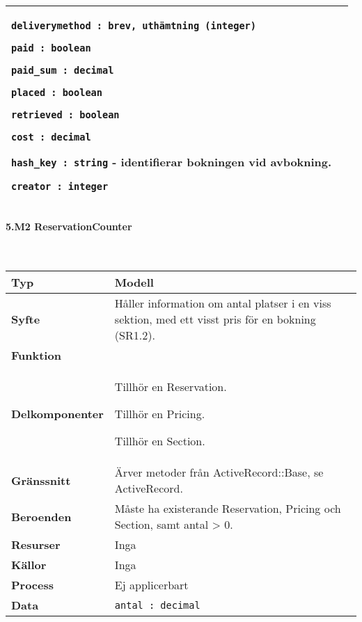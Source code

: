 \documentclass[a4paper, twoside, 11pt, titlepage]{article}
\begin{document}
\begin {table} [ht]
\begin{tabular} {  p{3.5cm} p{11.6cm} }
{{\tt deliverymethod : {brev, uthämtning} (integer)}

{\tt paid : boolean}

{\tt paid\_sum : decimal}

{\tt placed : boolean}

{\tt retrieved : boolean}

{\tt cost : decimal}

{\tt hash\_key : string} - identifierar bokningen vid avbokning.

{\tt creator : integer}} \\
				\hline
			\end{tabular} \end{table} \FloatBarrier


			\paragraph{5.M2 ReservationCounter}\

			\begin {table} [ht] \begin{tabular} {  p{3.5cm} p{11.6cm} }
				\hline
				{\sffamily\textbf{Typ}} & {Modell} \\
				\hline
				{\sffamily\textbf{Syfte}} & {Håller information om antal platser i en viss sektion, med ett visst pris för en bokning (SR1.2).} \\
				\hline
				{\sffamily\textbf{Funktion}} & { } \\
				\hline
				{\sffamily\textbf{Delkomponenter}} & {Tillhör en Reservation.

Tillhör en Pricing.

Tillhör en Section.} \\
				\hline
				{\sffamily\textbf{Gränssnitt}} & {Ärver metoder från ActiveRecord::Base, se ActiveRecord.} \\
				\hline
				{\sffamily\textbf{Beroenden}} & {Måste ha existerande Reservation, Pricing och Section, samt antal > 0.} \\
				\hline
				{\sffamily\textbf{Resurser}} & {Inga} \\
				\hline
				{\sffamily\textbf{Källor}} & {Inga} \\
				\hline
				{\sffamily\textbf{Process}} & {Ej applicerbart} \\
				\hline
				{\sffamily\textbf{Data}} & {{\tt antal : decimal}} \\
				\hline
			\end{tabular} \end{table} \FloatBarrier
\end{document}
